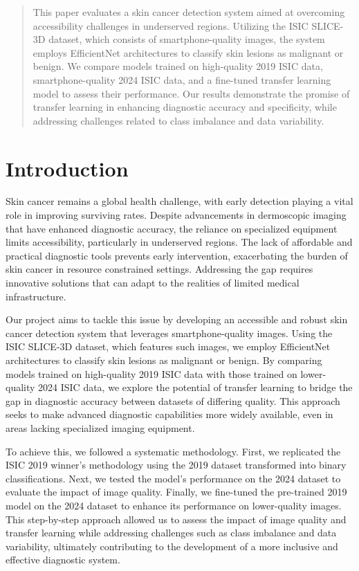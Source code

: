 \documentclass{article}
\begin{document}
\begin{abstract}
    This paper evaluates a skin cancer detection system aimed at overcoming accessibility challenges in underserved
    regions. Utilizing the ISIC SLICE-3D dataset, which consists of smartphone-quality images, the system employs
    EfficientNet architectures to classify skin lesions as malignant or benign. We compare models trained on high-quality
    2019 ISIC data, smartphone-quality 2024 ISIC data, and a fine-tuned transfer learning model to assess their
    performance. Our results demonstrate the promise of transfer learning in enhancing diagnostic accuracy and
    specificity, while addressing challenges related to class imbalance and data variability.
\end{abstract}

\section{Introduction}
\label{introduction}

Skin cancer remains a global health challenge, with early detection playing a vital role in improving surviving rates.
Despite advancements in dermoscopic imaging that have enhanced diagnostic accuracy, the reliance on specialized
equipment limits accessibility, particularly in underserved regions. The lack of affordable and practical diagnostic
tools prevents early intervention, exacerbating the burden of skin cancer in resource constrained settings. Addressing
the gap requires innovative solutions that can adapt to the realities of limited medical infrastructure.

Our project aims to tackle this issue by developing an accessible and robust skin cancer detection system that leverages
smartphone-quality images. Using the ISIC SLICE-3D dataset, which features such images, we employ EfficientNet
architectures to classify skin lesions as malignant or benign. By comparing models trained on high-quality 2019 ISIC
data with those trained on lower-quality 2024 ISIC data, we explore the potential of transfer learning to bridge the
gap in diagnostic accuracy between datasets of differing quality. This approach seeks to make advanced diagnostic
capabilities more widely available, even in areas lacking specialized imaging equipment.

To achieve this, we followed a systematic methodology. First, we replicated the ISIC 2019 winner's methodology
using the 2019 dataset transformed into binary classifications. Next, we tested the model’s performance on the 2024
dataset to evaluate the impact of image quality. Finally, we fine-tuned the pre-trained 2019 model on the 2024 dataset
to enhance its performance on lower-quality images. This step-by-step approach allowed us to assess the impact of
image quality and transfer learning while addressing challenges such as class imbalance and data variability,
ultimately contributing to the development of a more inclusive and effective diagnostic system.
\end{document}
